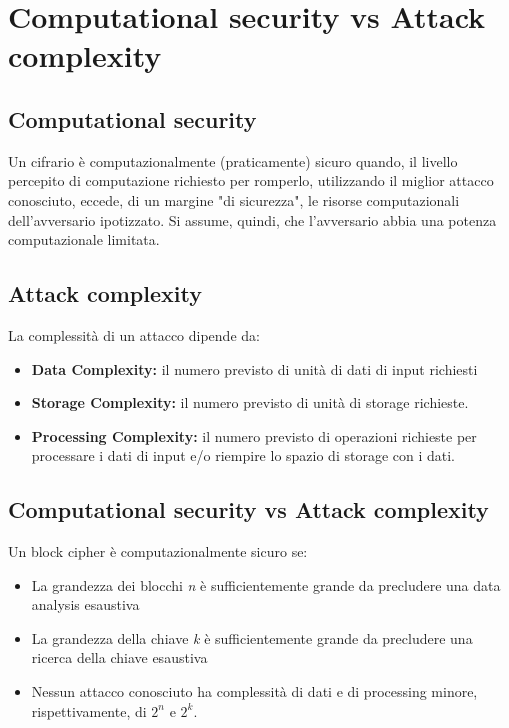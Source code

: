 \documentclass[a4paper,12pt]{article}
\begin{document}
\section{Computational security vs Attack complexity}
\subsection{Computational security}
Un cifrario è computazionalmente (praticamente) sicuro quando, il livello percepito di computazione richiesto per romperlo, utilizzando il miglior attacco conosciuto, eccede, di un margine "di sicurezza", le risorse computazionali dell'avversario ipotizzato.
Si assume, quindi, che l'avversario abbia una potenza computazionale limitata.
\subsection{Attack complexity}
La complessità di un attacco dipende da:
\begin{itemize}
	\item \textbf{Data Complexity:} il numero previsto di unità di dati di input richiesti
	\item \textbf{Storage Complexity:} il numero previsto di unità di storage richieste.
	\item \textbf{Processing Complexity:} il numero previsto di operazioni richieste per processare i dati di input e/o riempire lo spazio di storage con i dati.
\end{itemize}
\subsection{Computational security vs Attack complexity}
Un block cipher è computazionalmente sicuro se:
\begin{itemize}
	\item La grandezza dei blocchi \textit{n} è sufficientemente grande da precludere una data analysis esaustiva 
	\item La grandezza della chiave \textit{k} è sufficientemente grande da precludere una ricerca della chiave esaustiva
	\item Nessun attacco conosciuto ha complessità di dati e di processing minore, rispettivamente, di $2^n$ e $2^k$.
\end{itemize}
\end{document}
